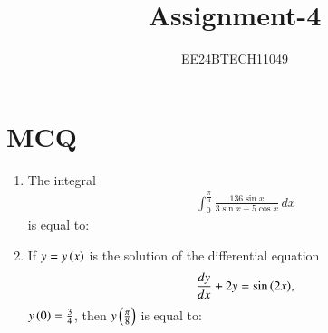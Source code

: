 \documentclass[journal]{IEEEtran}
\numberwithin{equation}{enumi}
\numberwithin{figure}{enumi}
\begin{document}


\title{Assignment-4}
\author{EE24BTECH11049}

{\let\newpage\relax\maketitle}

\section{MCQ}
\begin{enumerate}

    \item 
    The integral 
    \begin{align*}
        \int_0^{\frac{\pi}{4}}\frac{136\sin{x}}{3\sin{x} + 5\cos{x}}\, dx 
    \end{align*}
    is equal to:

    \hfill{}

    \begin{enumerate}
    \end{enumerate}

    \item 
    If $y = y\left(x\right)$ is the solution of the differential equation 
    \begin{align*}
        \frac{dy}{dx} + 2y = \sin{\ensuremath{\left(2x\right)}},
    \end{align*}
    $y\left(0\right) = \frac{3}{4}$, then $y\left(\frac{\pi}{8}\right)$ is equal to:

    \hfill{}

    \begin{enumerate}
    \end{enumerate}


\end{enumerate}
\end{document}
